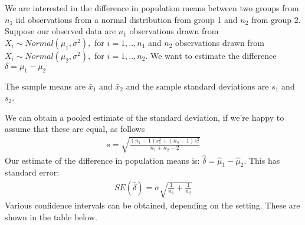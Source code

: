 \documentclass[letterpaper,10pt,english]{jupyterBook}
\begin{document}
\sphinxAtStartPar
We are interested in the difference in population means between two groups from \(n_1\) iid observations from a normal distribution from group 1 and \(n_2\) from group 2. Suppose our observed data are \(n_1\) observations drawn from \(X_i \sim Normal(\mu_1, \sigma^2),\) for \(i=1,..,n_1\) and \(n_2\) observations drawn from \(X_i \sim Normal(\mu_2, \sigma^2),\) for \(i=1,..,n_2\). We want to estimate the difference \(\delta = \mu_1 - \mu_2\)

\sphinxAtStartPar
The sample means are \(\bar{x}_1\) and \(\bar{x}_2\) and the sample standard deviations are \(s_1\) and \(s_2\).

\sphinxAtStartPar
We can obtain a pooled estimate of the standard deviation, if we’re happy to assume that these are equal, as follows
\begin{equation*}
\begin{split} 
s = \sqrt{\frac{(n_1 - 1) s_1^2 + (n_2 - 1) s_1^2 }{n_1 + n_2 - 2}}
\end{split}
\end{equation*}
\sphinxAtStartPar
Our estimate of the difference in population means is: \(\hat{\delta} = \hat{\mu}_1 - \hat{\mu}_2\). This has standard error:
\begin{equation*}
\begin{split} 
SE(\hat{\delta}) =  \sigma \sqrt{\frac{1}{n_1} + \frac{1}{n_2}}
\end{split}
\end{equation*}
\sphinxAtStartPar
Various confidence intervals can be obtained, depending on the setting. These are shown in the table below.
\end{document}
